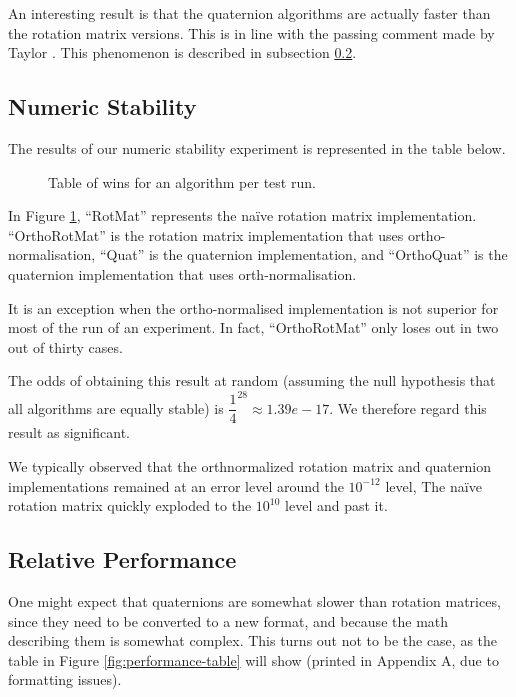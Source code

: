 \documentclass{acm_proc_article-sp}
\begin{document}
An interesting result is that the quaternion algorithms are actually faster than the rotation matrix versions.
This is in line with the passing comment made by Taylor \cite{taylor79}.
This phenomenon is described in subsection \ref{sec:performance}.

\subsection{Numeric Stability}
\label{sec:stability}

The results of our numeric stability experiment is represented in the table below.

\begin{figure}
\caption{Table of wins for an algorithm per test run.}
\label{fig:wins}
\end{figure}

In Figure \ref{fig:wins}, ``RotMat'' represents the na\"{i}ve rotation matrix implementation. ``OrthoRotMat'' is the rotation matrix implementation that uses ortho-normalisation, ``Quat'' is the quaternion implementation, and ``OrthoQuat'' is the quaternion implementation that uses orth-normalisation.

It is an exception when the ortho-normalised implementation is not superior for most of the run of an experiment.
In fact, ``OrthoRotMat'' only loses out in two out of thirty cases.

The odds of obtaining this result at random (assuming the null hypothesis that all algorithms are equally stable) is $\dfrac{1}{4}^{28} \approx 1.39e-17$.
We therefore regard this result as significant.

We typically observed that the orthnormalized rotation matrix and quaternion implementations remained at an error level around the $10^{-12}$ level, 
The na\"{i}ve rotation matrix quickly exploded to the $10^{10}$ level and past it.

\subsection{Relative Performance}
\label{sec:performance}

One might expect that quaternions are somewhat slower than rotation matrices, since they need to be converted to a new format, and because the math describing them is somewhat complex.
This turns out not to be the case, as the table in Figure \ref{fig:performance-table} will show (printed in Appendix A, due to formatting issues).
\end{document}
